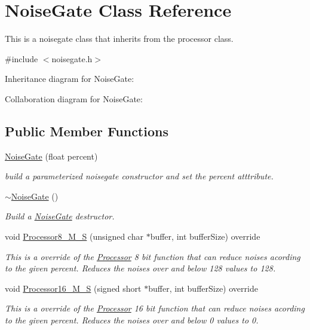 \hypertarget{classNoiseGate}{}\section{Noise\+Gate Class Reference}
\label{classNoiseGate}


This is a noisegate class that inherits from the processor class.  




{\ttfamily \#include $<$noisegate.\+h$>$}



Inheritance diagram for Noise\+Gate\+:


Collaboration diagram for Noise\+Gate\+:
\subsection*{Public Member Functions}
\begin{DoxyCompactItemize}
\item 
\mbox{\label{classNoiseGate_ababe59ad3df6837717d3e285f98c7a72}} 
\hyperlink{classNoiseGate_ababe59ad3df6837717d3e285f98c7a72}{Noise\+Gate} (float percent)
\begin{DoxyCompactList}\small\item\em build a parameterized noisegate constructor and set the percent atttribute. \end{DoxyCompactList}\item 
\mbox{\label{classNoiseGate_abcdf1888710c86086b1a595189191afd}} 
\hyperlink{classNoiseGate_abcdf1888710c86086b1a595189191afd}{$\sim$\+Noise\+Gate} ()
\begin{DoxyCompactList}\small\item\em Build a \hyperlink{classNoiseGate}{Noise\+Gate} destructor. \end{DoxyCompactList}\item 
void \hyperlink{classNoiseGate_afbf50fc4dce474a9f588696756b7e1ad}{Processor8\+\_\+\+M\+\_\+S} (unsigned char $\ast$buffer, int buffer\+Size) override
\begin{DoxyCompactList}\small\item\em This is a override of the \hyperlink{classProcessor}{Processor} 8 bit function that can reduce noises acording to the given percent. Reduces the noises over and below 128 values to 128. \end{DoxyCompactList}\item 
void \hyperlink{classNoiseGate_a8e1f9ab7c18b029fdae17ec621ac91d0}{Processor16\+\_\+\+M\+\_\+S} (signed short $\ast$buffer, int buffer\+Size) override
\begin{DoxyCompactList}\small\item\em This is a override of the \hyperlink{classProcessor}{Processor} 16 bit function that can reduce noises acording to the given percent. Reduces the noises over and below 0 values to 0. \end{DoxyCompactList}\end{DoxyCompactItemize}


